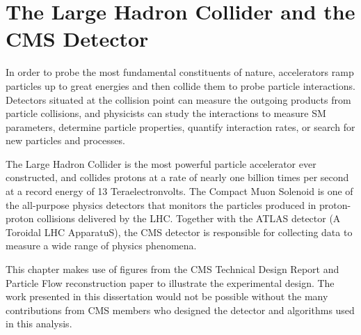 \chapter{The Large Hadron Collider and the CMS Detector}
\label{ch:detector}

In order to probe the most fundamental constituents of nature, accelerators ramp particles up to great energies and then collide them to probe particle interactions. Detectors situated at the collision point can measure the outgoing products from particle collisions, and physicists can study the interactions to measure SM parameters, determine particle properties, quantify interaction rates, or search for new particles and processes.

The Large Hadron Collider is the most powerful particle accelerator ever constructed, and collides protons at a rate of nearly one billion times per second at a record energy of 13 Teraelectronvolts. The Compact Muon Solenoid is one of the all-purpose physics detectors that monitors the particles produced in proton-proton collisions delivered by the LHC. Together with the ATLAS detector (A Toroidal LHC ApparatuS), the CMS detector is responsible for collecting data to measure a wide range of physics phenomena.





This chapter makes use of figures from the CMS Technical Design Report and Particle Flow reconstruction paper to illustrate the experimental design. The work presented in this dissertation would not be possible without the many contributions from CMS members who designed the detector and algorithms used in this analysis.

